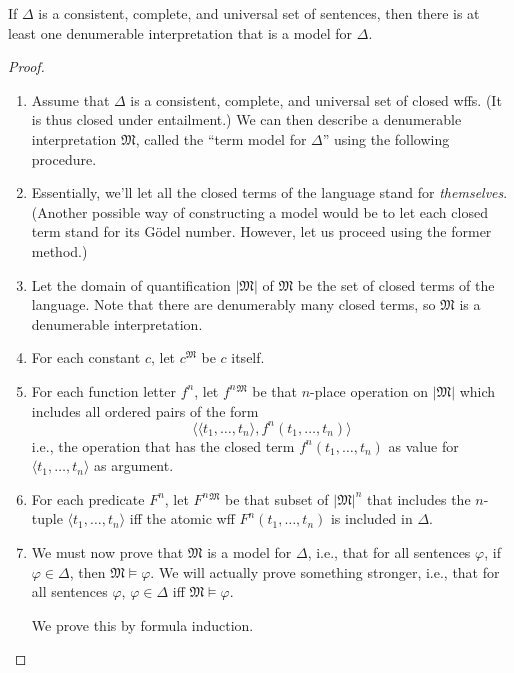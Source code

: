 \documentclass[12pt]{report}
\theoremstyle{nonumberplain}
\newtheorem{proof}{Proof}
\newcommand{\M}{\mathfrak{M}}
\begin{document}
\begin{mt}
If $Δ$ is a consistent, complete, and universal set of sentences, then there is at least one denumerable interpretation that is a model for $Δ$.\end{mt}
\begin{proof}
\begin{enumerate}
\item Assume that $Δ$ is a consistent, complete, and universal set of closed wffs. (It is thus closed under entailment.) We can then describe a denumerable interpretation $\M$, called the ``term model for $Δ$'' using the following procedure.

\item Essentially, we'll let all the closed terms of the language stand for \emph{themselves}. (Another possible way of constructing a model would be to let each closed term stand for its G\"odel number. However, let us proceed using the former method.)

\item Let the domain of quantification $|\M|$ of $\M$ be the set of closed terms of the language. Note that there are denumerably many closed terms, so $\M$ is a denumerable interpretation.

\item For each constant $c$, let $c^{\M}$ be $c$ itself.

\item For each function letter $f^n$, let $f^n{}^{\M}$ be that $n$-place operation on $|\M|$ which includes all ordered pairs of the form
\[ ⟨⟨t_1, \dotsc , t_n⟩, f^n(t_1, \dotsc , t_n)⟩\]
\noindent i.e., the operation that has the closed term $f^n(t_1, \dotsc , t_n)$ as value for $⟨t_1, \dotsc , t_n⟩$ as argument.

\item For each predicate $F^n$, let $F^n{}^{\M}$ be that subset of $|\M|^n$ that includes the
$n$-tuple $⟨t_1, \dotsc , t_n⟩$ iff the atomic wff
$F^n(t_1, \dotsc , t_n)$ is included in $Δ$.\label{mcl:model}

\item We must now prove that $\M$ is a model for $Δ$, i.e., that for all sentences $φ$, if
$φ ∈ Δ$, then $\M ⊨ φ$. We will actually prove something stronger, i.e., that for all sentences $φ$, $φ ∈Δ$ iff $\M ⊨ φ$.

We prove this by formula induction.

\smallskip


\end{enumerate}
\end{proof}
\end{document}
